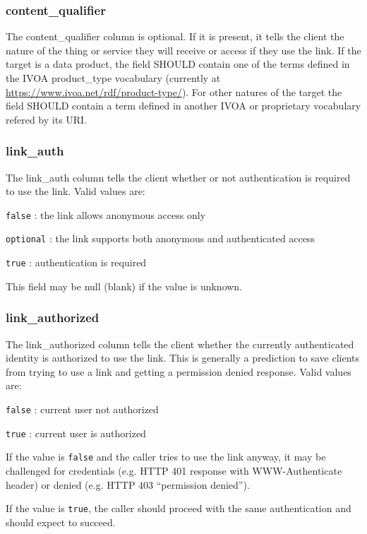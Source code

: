 \documentclass[11pt,a4paper]{ivoa}
\begin{document}
\subsubsection{content\_qualifier}

The content\_qualifier column is optional. If it is present, it tells 
the client the nature of the thing or service they will receive or access 
if they use the link. If the target is a data product, the field SHOULD contain 
one of the terms defined in the IVOA product\_type vocabulary (currently at 
\url{https://www.ivoa.net/rdf/product-type/}). For other natures of the target 
the field SHOULD contain a term defined in another IVOA or proprietary vocabulary 
refered by its URI.

\subsubsection{link\_auth}

The link\_auth column tells the client whether or not authentication is required 
to use the link. Valid values are:

\verb|false| : the link allows anonymous access only

\verb|optional| : the link supports both anonymous and authenticated access

\verb|true| : authentication is required

This field may be null (blank) if the value is unknown.

\subsubsection{link\_authorized}

The link\_authorized column tells the client whether the currently authenticated 
identity is authorized to use the link. This is generally a prediction to save 
clients from trying to use a link and getting a permission denied response. Valid 
values are:

\verb|false| : current user not authorized

\verb|true| : current user is authorized

If the value is \verb|false| and the caller tries to use the link anyway, it may be 
challenged for credentials (e.g. HTTP 401 response with WWW-Authenticate header) or 
denied (e.g. HTTP 403 ``permission denied'').

If the value is \verb|true|, the caller should proceed with the same authentication
and should expect to succeed.
\end{document}
